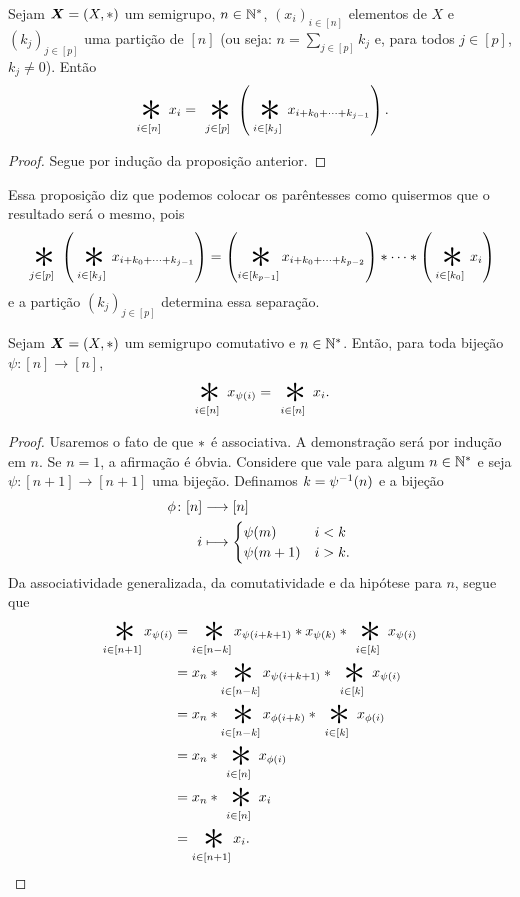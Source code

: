 \begin{proposition}
Sejam $\bm X=(X,\ast)$ um semigrupo, $n \in \mathbb{N}^*$, $(x_i)_{i \in [n]}$ elementos de $X$ e $(k_j)_{j \in [p]}$ uma partição de $[n]$ (ou seja: $n = \sum_{j \in [p]} k_j$ e, para todos $j \in [p]$, $k_j \neq 0$). Então
	\begin{equation*}
	\bigopb_{i \in [n]} x_i = \bigopb_{j \in [p]}\left(\bigopb_{i \in [k_j]} x_{i + k_0 + \cdots + k_{j-1}}\right).
	\end{equation*}
\end{proposition}
\begin{proof}
Segue por indução da proposição anterior.
\end{proof}

Essa proposição diz que podemos colocar os parêntesses como quisermos que o resultado será o mesmo, pois
	\begin{equation*}
	\bigopb_{j \in [p]}\left(\bigopb_{i \in [k_j]} x_{i + k_0 + \cdots + k_{j-1}}\right) = \left(\bigopb_{i \in [k_{p-1}]} x_{i + k_0 + \cdots + k_{p-2}}\right) \opb \cdots \opb \left(\bigopb_{i \in [k_0]} x_i\right)
	\end{equation*}
e a partição $(k_j)_{j \in [p]}$ determina essa separação.

\begin{proposition}
Sejam $\bm X=(X, \ast )$ um semigrupo comutativo e $n \in \mathbb{N}^*$. Então, para toda bijeção $\psi\colon [n] \to [n]$,
	\begin{equation*}
	\bigopb_{i \in [n]} x_{\psi(i)} = \bigopb_{i \in [n]} x_i.
	\end{equation*}
\end{proposition}
\begin{proof}
Usaremos o fato de que $\ast$ é associativa. A demonstração será por indução em $n$. Se $n=1$, a afirmação é óbvia. Considere que vale para algum $n \in \mathbb{N}^*$ e seja $\psi\colon [n+1] \to [n+1]$ uma bijeção. Definamos $k = \psi^{-1}(n)$ e a bijeção
	\begin{align*}
	\func{\phi}{[n]}{[n]}{i}{
		\begin{cases}
		\psi(m) 		& i<k \\
		\psi(m+1) & i>k.
		\end{cases}
	}
	\end{align*}
Da associatividade generalizada, da comutatividade e da hipótese para $n$, segue que
	\begin{align*}
	\bigopb_{i \in [n+1]} x_{\psi(i)}
		&= \bigopb_{i \in [n-k]} x_{\psi(i+k+1)} \opb x_{\psi(k)} \opb \bigopb_{i \in [k]} x_{\psi(i)} \\
		&= x_{n} \opb \bigopb_{i \in [n-k]} x_{\psi(i+k+1)} \opb \bigopb_{i \in [k]} x_{\psi(i)} \\
		&= x_{n} \opb \bigopb_{i \in [n-k]} x_{\phi(i+k)} \opb \bigopb_{i \in [k]} x_{\phi(i)} \\
		&= x_n \opb \bigopb_{i \in [n]} x_{\phi(i)}\\
		&= x_n \opb \bigopb_{i \in [n]} x_i \\
		&= \bigopb_{i \in [n+1]} x_i. \qedhere
	\end{align*}
\end{proof}


